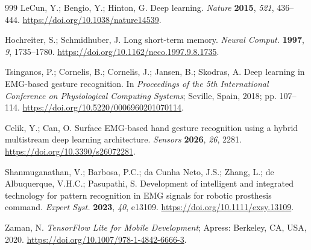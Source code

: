 \documentclass[technologies,article,submit,pdftex,moreauthors]{Definitions/mdpi}
\begin{document}
\begin{thebibliography}{999}
LeCun, Y.; Bengio, Y.; Hinton, G. Deep learning. \textit{Nature} \textbf{2015}, \textit{521}, 436--444. \url{https://doi.org/10.1038/nature14539}.

Hochreiter, S.; Schmidhuber, J. Long short-term memory. \textit{Neural Comput.} \textbf{1997}, \textit{9}, 1735--1780. \url{https://doi.org/10.1162/neco.1997.9.8.1735}.

Tsinganos, P.; Cornelis, B.; Cornelis, J.; Jansen, B.; Skodras, A. Deep learning in EMG-based gesture recognition. In \textit{Proceedings of the 5th International Conference on Physiological Computing Systems}; Seville, Spain, 2018; pp. 107--114. \url{https://doi.org/10.5220/0006960201070114}.

Celik, Y.; Can, O. Surface EMG-based hand gesture recognition using a hybrid multistream deep learning architecture. \textit{Sensors} \textbf{2026}, \textit{26}, 2281. \url{https://doi.org/10.3390/s26072281}.

Shanmuganathan, V.; Barbosa, P.C.; da Cunha Neto, J.S.; Zhang, L.; de Albuquerque, V.H.C.; Pasupathi, S. Development of intelligent and integrated technology for pattern recognition in EMG signals for robotic prosthesis command. \textit{Expert Syst.} \textbf{2023}, \textit{40}, e13109. \url{https://doi.org/10.1111/exsy.13109}.

Zaman, N. \textit{TensorFlow Lite for Mobile Development}; Apress: Berkeley, CA, USA, 2020. \url{https://doi.org/10.1007/978-1-4842-6666-3}.

\end{thebibliography}
\end{document}

